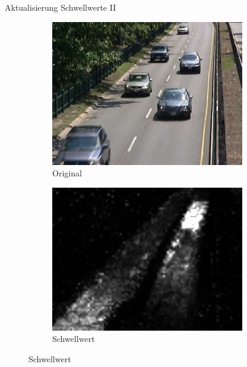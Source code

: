 \documentclass[hyperref={pdfpagelabels=false}]{beamer}
\begin{document}
\begin{frame}{Aktualisierung Schwellwerte II}
	\begin{figure}
		\captionsetup[subfigure]{labelformat=empty}
		\begin{subfigure}{.4\linewidth}
			\flushleft
			\includegraphics[width=\linewidth]{./Bilder/threshold_update/orig0850}
			\caption{Original}
		\end{subfigure}
		\hspace{10mm}
		\begin{subfigure}{.4\linewidth}
			\centering
			\includegraphics[width=\linewidth]{./Bilder/threshold_update/R_arr0850}
			\caption{Schwellwert}
		\end{subfigure}
	\end{figure}
\end{frame}
\end{document}
